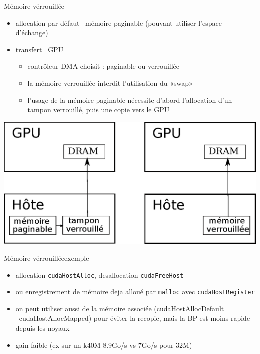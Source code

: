 \documentclass[11pt,mathserif]{beamer}
\newcommand{\gezi}{\faLongArrowRight}
\newcommand{\argi}{\faLightbulbO}
\newcommand{\triste}{\faFrownO}
\newcommand{\geziBikoitz}{\faArrowsH}
\begin{document}
\begin{frame}{Mémoire vérrouillée}
  \begin{itemize}[<+->]
    \item[\argi] allocation par défaut \gezi\ mémoire paginable (pouvant utiliser l'espace d'échange)
    \item[\argi] transfert \geziBikoitz\  GPU
      \begin{itemize}
        \item contrôleur DMA choisit : paginable ou verrouillée
        \item la mémoire verrouillée interdit l'utilisation du «swap»
        \item l'usage de la mémoire paginable nécessite d'abord l'allocation d'un tampon verrouillé, puis une copie vers le GPU
      \end{itemize}
  \end{itemize}
\pause
  \begin{center}
  \includegraphics[width=0.6\linewidth]{fig/pinned_memory.eps}
  \end{center}
\end{frame}
\begin{frame}{Mémoire vérrouillée}{exemple}
  \begin{itemize}[<+->]
    \item[\argi] allocation {\tt cudaHostAlloc}, desallocation {\tt cudaFreeHost}
    \item[\argi] ou enregistrement de mémoire deja alloué par {\tt malloc} avec {\tt cudaHostRegister}
  
\item[\argi] on peut utiliser aussi de la mémoire associée (cudaHostAllocDefault \gezi\ cudaHostAllocMapped) pour éviter la recopie, mais la BP est moins rapide depuis les noyaux
\item[\triste] gain faible (ex sur un k40M 8.9Go/s vs 7Go/s pour 32M)
  \end{itemize}
\end{frame}
\end{document}
